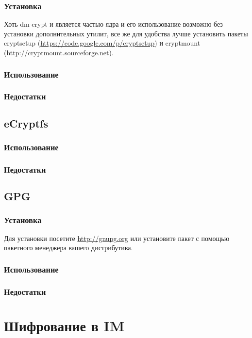 \subsubsection{Установка}
Хоть dm-crypt и является частью ядра и его использование возможно без установки дополнительных утилит, все же для удобства лучше установить пакеты cryptsetup (\url{https://code.google.com/p/cryptsetup}) и cryptmount (\url{http://cryptmount.sourceforge.net}).
\subsubsection{Использование}
\subsubsection{Недостатки}
\subsection{eCryptfs}
\subsubsection{Использование}
\subsubsection{Недостатки}
\subsection{GPG}
\subsubsection{Установка}
Для установки посетите \url{http://gnupg.org} или установите пакет с помощью пакетного менеджера вашего дистрибутива.
\subsubsection{Использование}
\subsubsection{Недостатки}

\section{Шифрование в IM}
